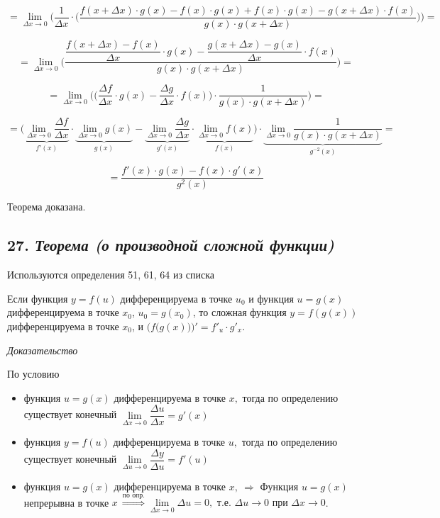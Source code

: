 $$
=\lim\limits_{\Delta x \rightarrow 0}\Bigg( \dfrac{1}{\Delta x}\cdot\bigg({\dfrac{f(x + \Delta x)\cdot g(x) - f(x)\cdot g(x) + f(x)\cdot g(x) -g(x + \Delta x)\cdot f(x)}{g(x)\cdot g(x + \Delta x)}}\bigg)\Bigg) 
=
$$

$$
=\lim\limits_{\Delta x \rightarrow 0}\Bigg( {\dfrac{{\dfrac{f(x + \Delta x) - f(x)}{\Delta x}}\cdot g(x) -  {\dfrac{g(x + \Delta x) - g(x)}{\Delta x}}\cdot f(x)}{g(x)\cdot g(x + \Delta x)}}\Bigg) 
=
$$

$$
=\lim\limits_{\Delta x \rightarrow 0}\Bigg(\bigg({\dfrac{\Delta f}{\Delta x}}\cdot g(x) -  {\dfrac{\Delta g}{\Delta x}}\cdot f(x)\bigg)\cdot\dfrac{1}{g(x)\cdot g(x + \Delta x)}\Bigg) =
$$

$$
=\Bigg(\underbrace{\lim\limits_{\Delta x \rightarrow 0}{\dfrac{\Delta f}{\Delta x}}}_{f'(x)}\cdot \underbrace{\lim\limits_{\Delta x \rightarrow 0}g(x)}_{g(x)} -  \underbrace{\lim\limits_{\Delta x \rightarrow 0}{\dfrac{\Delta g}{\Delta x}}}_{g'(x)}\cdot \underbrace{\lim\limits_{\Delta x \rightarrow 0}f(x)}_{f(x)}\Bigg)\cdot\underbrace{\lim\limits_{\Delta x \rightarrow 0}\dfrac{1}{g(x)\cdot g(x + \Delta x)}}_{g^{-2}(x)}=
$$

$$
= {\dfrac{f'(x)\cdot g(x) - f(x)\cdot g'(x)}{g^2(x)}}
$$

Теорема доказана.
\newpage 
\subsection*{27. \textit{Теорема (о производной сложной функции)}}
\begin{Quote2} 
\small\centering 

Используются определения 51, 61, 64 из списка \end{Quote2} 

Если функция $y=f(u)$ дифференцируема в точке $u_0$ и функция $u = g(x)$ дифференцируема в точке $x_0$, $u_0 = g(x_0)$, то сложная функция $y = f(g(x))$ дифференцируема в точке $x_0$, и $\Big(f\big(g(x)\big)\Big)' = f'_u\cdot g'_x$.
\vspace*{20pt} 

\textit{Доказательство}

По условию
\begin{itemize}

\item функция $u = g(x)$ дифференцируема в точке $x,$ тогда по определению существует конечный $\lim\limits_{\Delta x\rightarrow 0}{\dfrac{\Delta u}{\Delta x}} = g'(x)$
\item функция $y = f(u)$ дифференцируема в точке $u,$ тогда по определению существует конечный $\lim\limits_{\Delta u\rightarrow 0}{\dfrac{\Delta y}{\Delta u}} = f'(u)$
\item функция $u = g(x)$ дифференцируема в точке $x, \ \Rightarrow$ Функция $u = g(x)$ непрерывна в точке $x \ \overset{\text{по опр.}}{\Rightarrow} \lim\limits_{\Delta x \rightarrow 0}\Delta u = 0, \text{ т.е. } \Delta u \rightarrow 0 \text{ при } \Delta x \rightarrow 0$.

\end{itemize}

